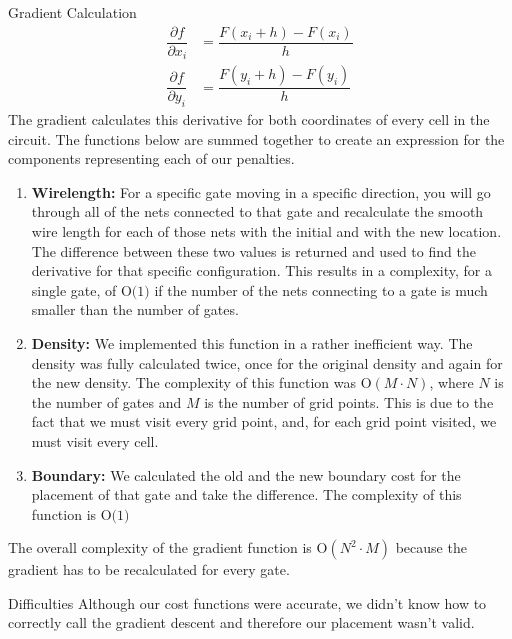 \documentclass[9pt]{extarticle}
\begin{document}
\begin{homeworkProblem}
\begin{homeworkSection}{Gradient Calculation}
        \begin{align*}
            \dfrac{\partial f}{\partial x_i} &= \dfrac{F(x_i + h) - F(x_i)}{h}\\
            \dfrac{\partial f}{\partial y_i} &= \dfrac{F(y_i + h) - F(y_i)}{h}
        \end{align*}
The gradient calculates this derivative for both coordinates of every cell in the circuit. The functions below are summed together to create an expression for the components representing each of our penalties.
        \begin{enumerate}
            \item[] \textbf{Wirelength:} For a specific gate moving in a specific direction, you will go through all of the nets connected to that gate and recalculate the smooth wire length for each of those nets with the initial and with the new location. The difference between these two values is returned and used to find the derivative for that specific configuration. This results in a complexity, for a single gate, of $\textrm{O(1)}$ if the number of the nets connecting to a
            gate is much smaller than the number of gates.

            \item[] \textbf{Density:} We implemented this function in a rather inefficient way. The density was fully calculated twice, once for the original density and again for the new density. The complexity of this function was $\textrm{O}(M \cdot N)$, where $N$ is the number of gates and $M$ is the number of grid points. This is due to the fact that we must visit every grid point, and, for each grid point visited, we must visit every cell.

            \item[] \textbf{Boundary:} We calculated the old and the new boundary cost for the placement of that gate and take the difference. The complexity of this function is $\textrm{O(1)}$
        \end{enumerate}

        The overall complexity of the gradient function is $\textrm{O}(N^2 \cdot M)$ because the gradient has to be recalculated for every gate.
    
    \end{homeworkSection}

    \begin{homeworkSection}{Difficulties}
        Although our cost functions were accurate, we didn't know how to correctly call the gradient descent and therefore our placement wasn't valid.
    \end{homeworkSection}
    
\end{homeworkProblem}
\end{document}
